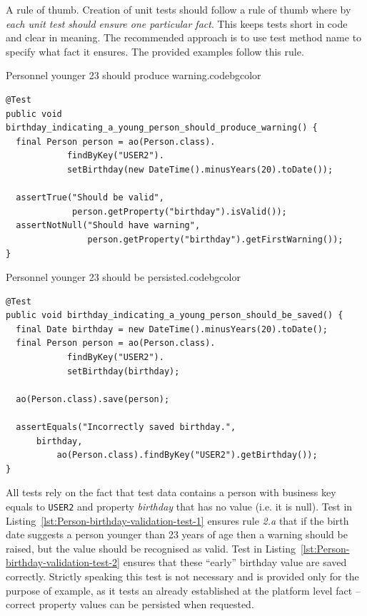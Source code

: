   \begin{notebox}{A rule of thumb.}{\label{mb:rule-of-thumb}}
    Creation of unit tests should follow a rule of thumb where by \emph{each unit test should ensure one particular fact}.
    This keeps tests short in code and clear in meaning.
    The recommended approach is to use test method name to specify what fact it ensures.
    The provided examples follow this rule.
  \end{notebox}  

 \begin{code}{Personnel younger 23 should produce warning.}{\label{lst:Person-birthday-validation-test-1}}{codebgcolor}
    \begin{lstlisting}
@Test
public void birthday_indicating_a_young_person_should_produce_warning() {	
  final Person person = ao(Person.class).
			findByKey("USER2").
			setBirthday(new DateTime().minusYears(20).toDate());	

  assertTrue("Should be valid", 
             person.getProperty("birthday").isValid());
  assertNotNull("Should have warning", 
                person.getProperty("birthday").getFirstWarning());
}
    \end{lstlisting}
  \end{code}

\begin{code}{Personnel younger 23 should be persisted.}{\label{lst:Person-birthday-validation-test-2}}{codebgcolor}
    \begin{lstlisting}
@Test
public void birthday_indicating_a_young_person_should_be_saved() {	
  final Date birthday = new DateTime().minusYears(20).toDate();
  final Person person = ao(Person.class).
			findByKey("USER2").
			setBirthday(birthday);

  ao(Person.class).save(person);

  assertEquals("Incorrectly saved birthday.", 
	  birthday,
          ao(Person.class).findByKey("USER2").getBirthday());
}
    \end{lstlisting}
  \end{code}

  All tests rely on the fact that test data contains a person with business key equals to \texttt{USER2} and property \emph{birthday} that has no value (i.e. it is null).
  Test in Listing~\ref{lst:Person-birthday-validation-test-1} ensures rule \emph{2.a} that if the birth date suggests a person younger than 23 years of age then a warning should be raised, but the value should be recognised as valid.
  Test in Listing~\ref{lst:Person-birthday-validation-test-2} ensures that these ``early'' birthday value are saved correctly.
  Strictly speaking this test is not necessary and is provided only for the purpose of example, as it tests an already established at the platform level fact -- correct property values can be persisted when requested.

